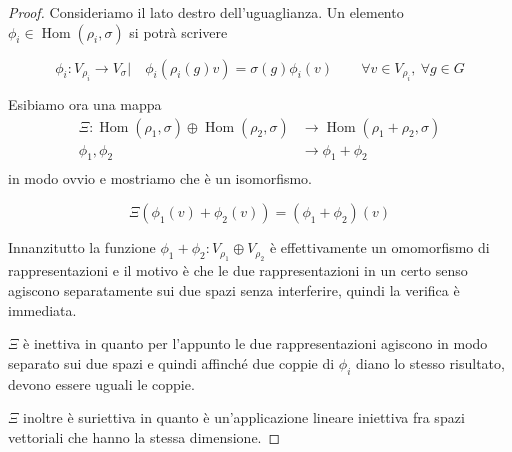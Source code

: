 \documentclass[11pt]{article}
\theoremstyle{plain}
\theoremstyle{definition}
\theoremstyle{remark}
\DeclareMathOperator{\Hom}{Hom}
\begin{document}
\begin{proof}


Consideriamo il lato destro dell'uguaglianza. Un elemento $\phi_i \in \Hom(\rho_i, \sigma)$ si potrà scrivere

\[
\phi_i :V_{\rho_i} \to V_\sigma | \quad \phi_i\left( \rho_i(g) v\right) = \sigma(g) \phi_i(v) \qquad \forall v \in V_{\rho_i}, \ \forall g \in G
\]

Esibiamo ora una mappa
\begin{align*}
\Xi :  \Hom(\rho_1, \sigma) \oplus \Hom(\rho_2, \sigma) &\to \Hom(\rho_1 + \rho_2, \sigma) \\
\phi_1 , \phi_2                                       &\to \phi_1 + \phi_2 \\
\end{align*}
 in modo ovvio e mostriamo che è un isomorfismo.

\[ \Xi (\phi_1(v) + \phi_2(v)) = (\phi_1 + \phi_2) (v) \]


Innanzitutto la funzione $\phi_1 + \phi_2 : V_{\rho_1} \oplus V_{\rho_2}$ è effettivamente un omomorfismo di rappresentazioni e il motivo è che le due rappresentazioni in un certo senso agiscono separatamente sui due spazi senza interferire, quindi la verifica è immediata.

$\Xi$ è inettiva in quanto per l'appunto le due rappresentazioni agiscono in modo separato sui due spazi e quindi affinché due coppie di $\phi_i$ diano lo stesso risultato, devono essere uguali le coppie.

$\Xi$ inoltre è suriettiva in quanto è un'applicazione lineare iniettiva fra spazi vettoriali che hanno la stessa dimensione.

\end{proof}
\end{document}
